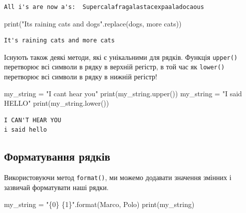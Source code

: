 \documentclass[
  letterpaper,
]{report}
\newenvironment{Shaded}{\begin{snugshade}}{\end{snugshade}}
\newcommand{\BuiltInTok}[1]{\textcolor[rgb]{0.00,0.23,0.31}{#1}}
\newcommand{\NormalTok}[1]{\textcolor[rgb]{0.00,0.23,0.31}{#1}}
\newcommand{\OperatorTok}[1]{\textcolor[rgb]{0.37,0.37,0.37}{#1}}
\newcommand{\SpecialCharTok}[1]{\textcolor[rgb]{0.37,0.37,0.37}{#1}}
\newcommand{\StringTok}[1]{\textcolor[rgb]{0.13,0.47,0.30}{#1}}
\begin{document}
\begin{verbatim}
All i's are now a's:  Supercalafragalastacexpaaladocaous
\end{verbatim}

\begin{Shaded}
\begin{Highlighting}[]
\BuiltInTok{print}\NormalTok{(}\StringTok{"It\textquotesingle{}s raining cats and dogs"}\NormalTok{.replace(}\StringTok{\textquotesingle{}dogs\textquotesingle{}}\NormalTok{, }\StringTok{\textquotesingle{}more cats\textquotesingle{}}\NormalTok{))}
\end{Highlighting}
\end{Shaded}

\begin{verbatim}
It's raining cats and more cats
\end{verbatim}

Існують також деякі методи, які є унікальними для рядків. Функція
\texttt{upper()} перетворює всі символи в рядку в верхній регістр, в той
час як \texttt{lower()} перетворює всі символи в рядку в нижній регістр!

\begin{Shaded}
\begin{Highlighting}[]
\NormalTok{my\_string }\OperatorTok{=} \StringTok{"I can\textquotesingle{}t hear you"}
\BuiltInTok{print}\NormalTok{(my\_string.upper())}
\NormalTok{my\_string }\OperatorTok{=} \StringTok{"I said HELLO"}
\BuiltInTok{print}\NormalTok{(my\_string.lower())}
\end{Highlighting}
\end{Shaded}

\begin{verbatim}
I CAN'T HEAR YOU
i said hello
\end{verbatim}

\hypertarget{ux444ux43eux440ux43cux430ux442ux443ux432ux430ux43dux43dux44f-ux440ux44fux434ux43aux456ux432}{%
\subsection{Форматування
рядків}\label{ux444ux43eux440ux43cux430ux442ux443ux432ux430ux43dux43dux44f-ux440ux44fux434ux43aux456ux432}}

Використовуючи метод \texttt{format()}, ми можемо додавати значення
змінних і зазвичай форматувати наші рядки.

\begin{Shaded}
\begin{Highlighting}[]
\NormalTok{my\_string }\OperatorTok{=} \StringTok{"}\SpecialCharTok{\{0\}}\StringTok{ }\SpecialCharTok{\{1\}}\StringTok{"}\NormalTok{.}\BuiltInTok{format}\NormalTok{(}\StringTok{\textquotesingle{}Marco\textquotesingle{}}\NormalTok{, }\StringTok{\textquotesingle{}Polo\textquotesingle{}}\NormalTok{)}
\BuiltInTok{print}\NormalTok{(my\_string)}
\end{Highlighting}
\end{Shaded}
\end{document}

